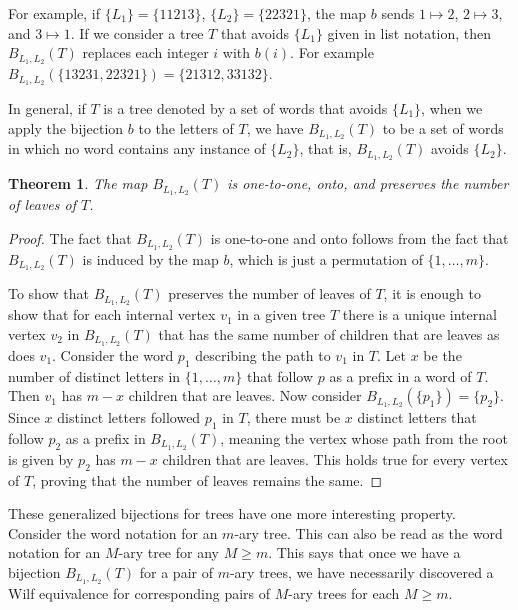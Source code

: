 \documentclass[12pt]{article}
\newtheorem{theorem}{Theorem}
\begin{document}
For example, if $\{L_1\} = \{11213\}$, $\{L_2\} = \{22321\}$, the map $b$ sends $1 \mapsto 2$, $2 \mapsto 3$, and $3 \mapsto 1$.  If we consider a tree $T$ that avoids $\{L_1\}$ given in list notation, then $B_{L_1,L_2}(T)$ replaces each integer $i$ with $b(i)$.  For example $B_{L_1,L_2}(\{13231,22321\}) = \{21312,33132\}$.

In general, if $T$ is a tree denoted by a set of words that avoids $\{L_1\}$, when we apply the bijection $b$ to the letters of $T$, we have $B_{L_1,L_2}(T)$ to be a set of words in which no word contains any instance of $\{L_2\}$, that is, $B_{L_1,L_2}(T)$ avoids $\{L_2\}$.

\begin{theorem} 
\label{superpattern}
The map $B_{L_1,L_2}(T)$ is one-to-one, onto, and preserves the number of leaves of $T$.
\end{theorem}

\begin{proof}
The fact that $B_{L_1,L_2}(T)$ is one-to-one and onto follows from the fact that $B_{L_1,L_2}(T)$ is induced by the map $b$, which is just a permutation of $\{1,\dots,m\}$.

To show that $B_{L_1,L_2}(T)$ preserves the number of leaves of $T$, it is enough to show that for each internal vertex $v_1$ in a given tree $T$ there is a unique internal vertex $v_2$ in $B_{L_1,L_2}(T)$ that has the same number of children that are leaves as does $v_1$. Consider the word $p_1$ describing the path to $v_1$ in $T$. Let $x$ be the number of distinct letters in $\{1,\dots,m\}$ that follow $p$ as a prefix in a word of $T$.  Then $v_1$ has $m-x$ children that are leaves. Now consider $B_{L_1,L_2}(\{p_1\})=\{p_2\}$.  Since $x$ distinct letters followed $p_1$ in $T$, there must be $x$ distinct letters that follow $p_2$ as a prefix in $B_{L_1,L_2}(T)$, meaning the vertex whose path from the root is given by $p_2$ has $m-x$ children that are leaves.  This holds true for every vertex of $T$, proving that the number of leaves remains the same.
\end{proof}

These generalized bijections for trees have one more interesting property.  Consider the word notation for an $m$-ary tree.  This can also be read as the word notation for an $M$-ary tree for any $M \geq m$.  This says that once we have a bijection $B_{L_1,L_2}(T)$ for a pair of $m$-ary trees, we have necessarily discovered a Wilf equivalence for corresponding pairs of $M$-ary trees for each $M \geq m$.
\end{document}
